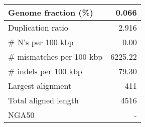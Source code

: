 \documentclass[12pt,a4paper]{article}
\begin{document}
\begin{table}[ht]
\begin{center}
\begin{tabular}{|l*{1}{|r}|}
Genome fraction (\%) & 0.066 \\ \hline
Duplication ratio & 2.916 \\ \hline
\# N's per 100 kbp & 0.00 \\ \hline
\# mismatches per 100 kbp & 6225.22 \\ \hline
\# indels per 100 kbp & 79.30 \\ \hline
Largest alignment & 411 \\ \hline
Total aligned length & 4516 \\ \hline
NGA50 & - \\ \hline
\end{tabular}
\end{center}
\end{table}
\end{document}
